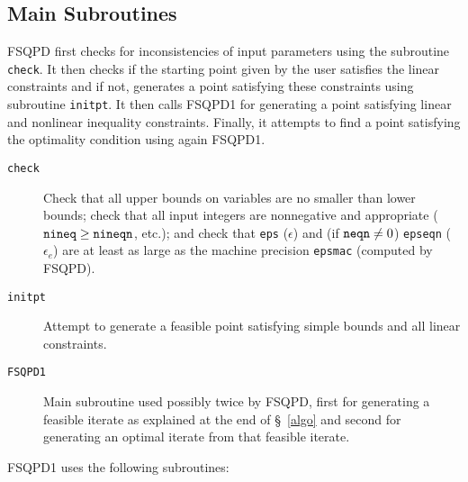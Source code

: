 \subsection{Main Subroutines}
\label{mainorg}
FSQPD first checks for inconsistencies of input parameters using the 
subroutine {\tt check}. It then checks if the starting 
point given by the user satisfies the linear 
constraints and if not, generates a point 
satisfying these constraints using
subroutine {\tt initpt}. It then calls FSQPD1 for generating a point
satisfying linear and nonlinear inequality constraints. Finally, 
it attempts to find
a point satisfying the optimality condition using again FSQPD1.
\begin{description}
\item[\tt check] Check that all upper bounds on variables 
                 are no smaller than lower bounds; 
                 check that all input integers are nonnegative
                 and appropriate (${\tt nineq} \geq {\tt nineqn}$, etc.);
                 and check that {\tt eps} ($\epsilon$) 
                 and (if ${\tt neqn}\ne 0$) {\tt epseqn} 
                 ($\epsilon_e$) are at least as large as 
                 the machine precision {\tt epsmac} (computed by FSQPD).
\item[\tt initpt] Attempt to generate a feasible point satisfying 
                 simple bounds and all linear constraints.
\item[\tt FSQPD1] Main subroutine used possibly twice by FSQPD, 
                  first for generating
                  a feasible iterate as explained at the 
                  end of \S~\ref{algo} and
                  second for generating an optimal iterate 
                  from that feasible iterate.
\end{description}
FSQPD1 uses the following subroutines:

